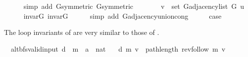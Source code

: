 \begin{isabellebody}
\ \ \ \ \isamarkupfalse%
\ {\isacharparenleft}{\kern0pt}simp\ add{\isacharcolon}{\kern0pt}\ G{}{\isacharunderscore}{\kern0pt}symmetric\ G{}{\isacharunderscore}{\kern0pt}symmetric{\isacharparenright}{\kern0pt}\isanewline
\ \ \isamarkupfalse%
\ \isamarkupfalse%
\ {\isachardoublequoteopen}{\isachardot}{\kern0pt}{\isachardot}{\kern0pt}{\isachardot}{\kern0pt}\ {\isasymlongleftrightarrow}\ v\ {\isasymin}\ set\ {\isacharparenleft}{\kern0pt}G{\isachardot}{\kern0pt}adjacency{\isacharunderscore}{\kern0pt}list\ G\ u{\isacharparenright}{\kern0pt}{\isachardoublequoteclose}\isanewline
\ \ \ \ \isamarkupfalse%
\ invar{\isacharunderscore}{\kern0pt}G{}\ invar{\isacharunderscore}{\kern0pt}G{}\isanewline
\ \ \ \ \isamarkupfalse%
\ {\isacharparenleft}{\kern0pt}simp\ add{\isacharcolon}{\kern0pt}\ G{\isachardot}{\kern0pt}adjacency{\isacharunderscore}{\kern0pt}union{\isacharunderscore}{\kern0pt}cong{\isacharparenright}{\kern0pt}\isanewline
\ \ \isamarkupfalse%
\ \isamarkupfalse%
\ {\isacharquery}{\kern0pt}case\isanewline
\ \ \ \ \isacommand{{\isachardot}{\kern0pt}}\isamarkupfalse%
\isanewline
{}\isamarkupfalse%
%
\endisatagproof
{\isafoldproof}%
%
\isadelimproof
\isanewline
%
\endisadelimproof
{}\isamarkupfalse%
%
\isadelimdocument
%
\endisadelimdocument
%
\isatagdocument
%
\isamarkuptrue%
%
\endisatagdocument
{\isafolddocument}%
%
\isadelimdocument
%
\endisadelimdocument
%
\begin{isamarkuptext}%
The loop invariants of  are very similar to those of .%
\end{isamarkuptext}\isamarkuptrue%
\isamarkupfalse%
\ {\isacharparenleft}{\kern0pt}\ alt{\isacharunderscore}{\kern0pt}bfs{\isacharunderscore}{\kern0pt}valid{\isacharunderscore}{\kern0pt}input{\isacharparenright}{\kern0pt}\ d\ {\isacharcolon}{\kern0pt}{\isacharcolon}{\kern0pt}\ {\isachardoublequoteopen}{\isacharprime}{\kern0pt}m\ {\isasymRightarrow}\ {\isacharprime}{\kern0pt}a\ {\isasymRightarrow}\ nat{\isachardoublequoteclose}\ \isanewline
\ \ {\isachardoublequoteopen}d\ m\ v\ {\isasymequiv}\ path{\isacharunderscore}{\kern0pt}length\ {\isacharparenleft}{\kern0pt}rev{\isacharunderscore}{\kern0pt}follow\ m\ v{\isacharparenright}{\kern0pt}{\isachardoublequoteclose}\isanewline

\end{isabellebody}
